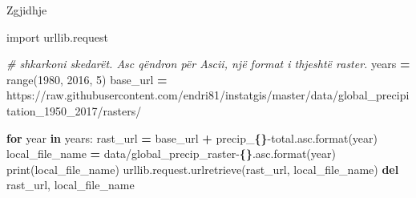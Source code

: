\documentclass[
  ignorenonframetext,
]{beamer}
\newenvironment{Shaded}{\begin{snugshade}}{\end{snugshade}}
\newcommand{\BuiltInTok}[1]{#1}
\newcommand{\CommentTok}[1]{\textcolor[rgb]{0.56,0.35,0.01}{\textit{#1}}}
\newcommand{\ControlFlowTok}[1]{\textcolor[rgb]{0.13,0.29,0.53}{\textbf{#1}}}
\newcommand{\DecValTok}[1]{\textcolor[rgb]{0.00,0.00,0.81}{#1}}
\newcommand{\ImportTok}[1]{#1}
\newcommand{\KeywordTok}[1]{\textcolor[rgb]{0.13,0.29,0.53}{\textbf{#1}}}
\newcommand{\NormalTok}[1]{#1}
\newcommand{\OperatorTok}[1]{\textcolor[rgb]{0.81,0.36,0.00}{\textbf{#1}}}
\newcommand{\SpecialCharTok}[1]{\textcolor[rgb]{0.81,0.36,0.00}{\textbf{#1}}}
\newcommand{\StringTok}[1]{\textcolor[rgb]{0.31,0.60,0.02}{#1}}
\begin{document}
\begin{frame}[fragile]{Zgjidhje}
\protect\hypertarget{zgjidhje}{}

\begin{Shaded}
\begin{Highlighting}[]
\ImportTok{import}\NormalTok{ urllib.request}

\CommentTok{\# shkarkoni skedarët. Asc qëndron për Ascii, një format i thjeshtë raster.}
\NormalTok{years }\OperatorTok{=} \BuiltInTok{range}\NormalTok{(}\DecValTok{1980}\NormalTok{, }\DecValTok{2016}\NormalTok{, }\DecValTok{5}\NormalTok{)}
\NormalTok{base\_url }\OperatorTok{=} \StringTok{\textquotesingle{}https://raw.githubusercontent.com/endri81/instatgis/master/data/global\_precipitation\_1950\_2017/rasters/\textquotesingle{}}

\ControlFlowTok{for}\NormalTok{ year }\KeywordTok{in}\NormalTok{ years:}
\NormalTok{    rast\_url }\OperatorTok{=}\NormalTok{ base\_url }\OperatorTok{+} \StringTok{\textquotesingle{}precip\_}\SpecialCharTok{\{\}}\StringTok{{-}total.asc\textquotesingle{}}\NormalTok{.}\BuiltInTok{format}\NormalTok{(year)}
\NormalTok{    local\_file\_name }\OperatorTok{=} \StringTok{\textquotesingle{}data/global\_precip\_raster{-}}\SpecialCharTok{\{\}}\StringTok{.asc\textquotesingle{}}\NormalTok{.}\BuiltInTok{format}\NormalTok{(year)}
    \BuiltInTok{print}\NormalTok{(local\_file\_name)}
\NormalTok{    urllib.request.urlretrieve(rast\_url, local\_file\_name)}
    \KeywordTok{del}\NormalTok{ rast\_url, local\_file\_name}
\end{Highlighting}
\end{Shaded}
\end{frame}
\end{document}
